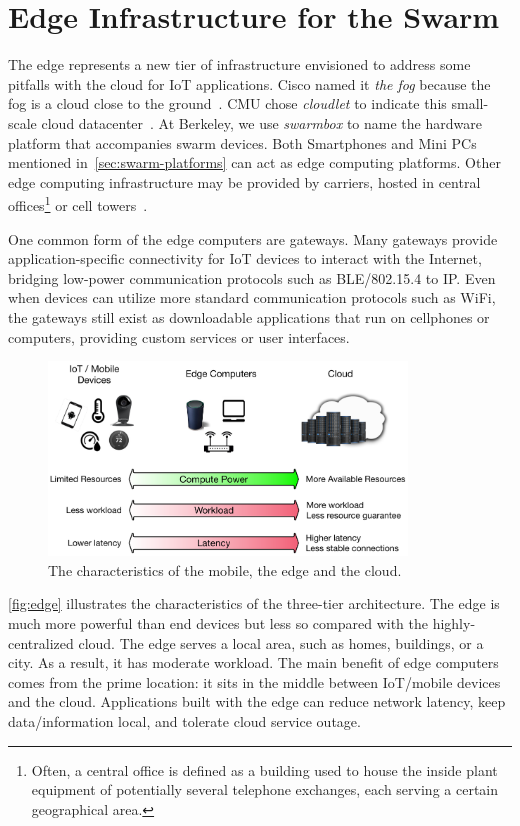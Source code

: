 \section{Edge Infrastructure for the Swarm}
\label{sec:edge-computing}

The edge represents a new tier of infrastructure envisioned to address some
pitfalls with the cloud for IoT applications. Cisco named it \textit{the fog}
because the fog is a cloud close to the ground~\cite{bonomi2012fog}. CMU chose
\textit{cloudlet} to indicate this small-scale cloud
datacenter~\cite{ha2014towards, satyanarayanan2009case}. At Berkeley, we use
\textit{swarmbox} to name the hardware platform that accompanies swarm
devices. Both Smartphones and Mini PCs mentioned
in~\autoref{sec:swarm-platforms} can act as edge computing platforms. Other edge
computing infrastructure may be provided by carriers, hosted in central
offices\footnote{Often, a central office is defined as a building used to house
  the inside plant equipment of potentially several telephone exchanges, each
  serving a certain geographical area.} or cell towers~\cite{att2017edge}.

One common form of the edge computers are gateways. Many gateways provide
application-specific connectivity for IoT devices to interact with the Internet,
bridging low-power communication protocols such as BLE/802.15.4 to IP. Even when
devices can utilize more standard communication protocols such as WiFi, the
gateways still exist as downloadable applications that run on cellphones or
computers, providing custom services or user interfaces.

\begin{figure}
  \centering
  \includegraphics[width=0.85\textwidth]{figures/background.pdf}
  \caption{The characteristics of the mobile, the edge and the cloud.}
  \label{fig:edge}
\end{figure}

\autoref{fig:edge} illustrates the characteristics of the three-tier
architecture. The edge is much more powerful than end devices but less so
compared with the highly-centralized cloud. The edge serves a local area, such
as homes, buildings, or a city. As a result, it has moderate workload. The main
benefit of edge computers comes from the prime location: it sits in the middle
between IoT/mobile devices and the cloud. Applications built with the edge can
reduce network latency, keep data/information local, and tolerate cloud service
outage.

